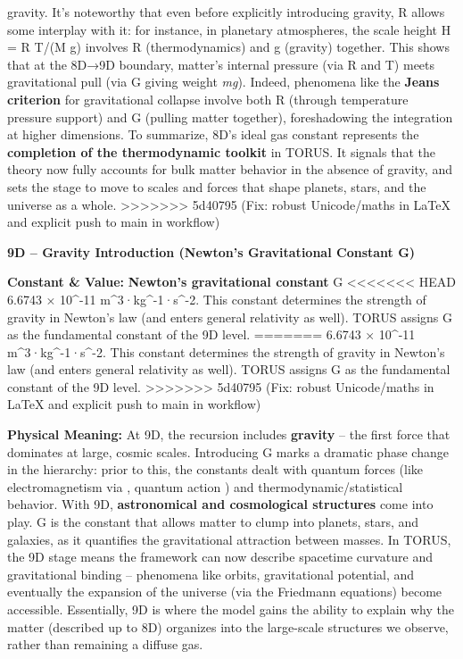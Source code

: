 \documentclass[]{article}
\begin{document}
gravity. It's noteworthy that even before explicitly introducing
gravity, R allows some interplay with it: for instance, in planetary
atmospheres, the scale height H = R T/(M g) involves R (thermodynamics)
and g (gravity) together​. This shows that at the 8D→9D boundary,
matter's internal pressure (via R and T) meets gravitational pull (via G
giving weight \emph{mg}). Indeed, phenomena like the \textbf{Jeans
criterion} for gravitational collapse involve both R (through
temperature pressure support) and G (pulling matter together),
foreshadowing the integration at higher dimensions. To summarize, 8D's
ideal gas constant represents the \textbf{completion of the
thermodynamic toolkit} in TORUS. It signals that the theory now fully
accounts for bulk matter behavior in the absence of gravity, and sets
the stage to move to scales and forces that shape planets, stars, and
the universe as a whole.
>>>>>>> 5d40795 (Fix: robust Unicode/maths in LaTeX and explicit push to main in workflow)

\textbf{9D -- Gravity Introduction (Newton's Gravitational Constant G)}

\textbf{Constant \& Value:} \textbf{Newton's gravitational constant} G \approx
<<<<<<< HEAD
6.6743 × 10\^{}-11 m\^{}3·kg\^{}-1·s\^{}-2\hspace{0pt}. This constant
determines the strength of gravity in Newton's law (and enters general
relativity as well). TORUS assigns G as the fundamental constant of the
9D level.
=======
6.6743 × 10\^{}-11 m\^{}3·kg\^{}-1·s\^{}-2​. This constant determines
the strength of gravity in Newton's law (and enters general relativity
as well). TORUS assigns G as the fundamental constant of the 9D level.
>>>>>>> 5d40795 (Fix: robust Unicode/maths in LaTeX and explicit push to main in workflow)

\textbf{Physical Meaning:} At 9D, the recursion includes
\textbf{gravity} -- the first force that dominates at large, cosmic
scales. Introducing G marks a dramatic phase change in the hierarchy:
prior to this, the constants dealt with quantum forces (like
electromagnetism via \alpha, quantum action \hbar) and thermodynamic/statistical
behavior. With 9D, \textbf{astronomical and cosmological structures}
come into play​. G is the constant that allows matter to clump into
planets, stars, and galaxies, as it quantifies the gravitational
attraction between masses. In TORUS, the 9D stage means the framework
can now describe spacetime curvature and gravitational binding --
phenomena like orbits, gravitational potential, and eventually the
expansion of the universe (via the Friedmann equations) become
accessible. Essentially, 9D is where the model gains the ability to
explain why the matter (described up to 8D) organizes into the
large-scale structures we observe, rather than remaining a diffuse gas.
\end{document}
